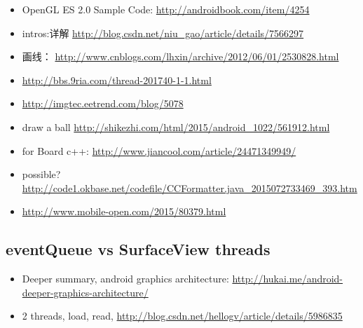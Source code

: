 \documentclass[9pt,b5paper]{article}
\begin{document}
\begin{itemize}
\item OpenGL ES 2.0 Sample Code: \url{http://androidbook.com/item/4254}
\item intros:详解 \url{http://blog.csdn.net/niu_gao/article/details/7566297}
\item 画线： \url{http://www.cnblogs.com/lhxin/archive/2012/06/01/2530828.html}
\item \url{http://bbs.9ria.com/thread-201740-1-1.html}
\item \url{http://imgtec.eetrend.com/blog/5078}
\item draw a ball \url{http://shikezhi.com/html/2015/android_1022/561912.html}
\item for Board c++: \url{http://www.jiancool.com/article/24471349949/}
\item possible? \url{http://code1.okbase.net/codefile/CCFormatter.java_2015072733469_393.htm}
\item \url{http://www.mobile-open.com/2015/80379.html}
\end{itemize}
\subsection{eventQueue vs SurfaceView threads}
\label{sec-2-6}
\begin{itemize}
\item Deeper summary, android graphics architecture: \url{http://hukai.me/android-deeper-graphics-architecture/}
\item 2 threads, load, read, \url{http://blog.csdn.net/hellogv/article/details/5986835}
\end{itemize}
\end{document}
